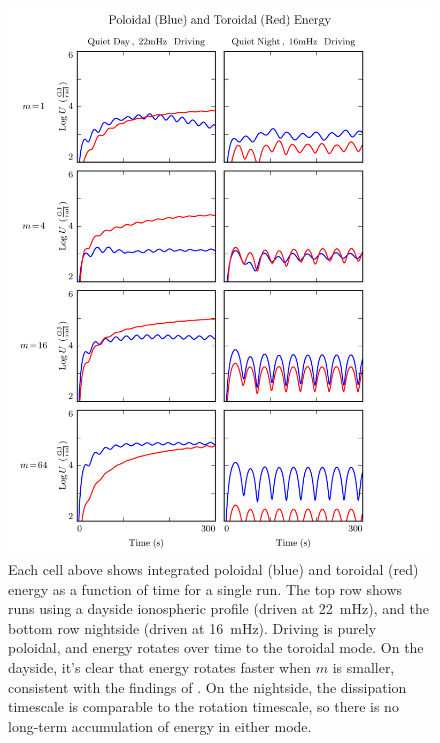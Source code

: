 \documentclass{article}
\newcommand{\azm}{\ensuremath{m}\xspace}
\begin{document}
\begin{figure}
    \label{fig_energy}
    \begin{center}
    \includegraphics[width=\textwidth]{figures/fig_energy.pdf}
    \caption{
        Each cell above shows integrated poloidal (blue) and toroidal (red) energy as a function of time for a single run. The top row shows runs using a dayside ionospheric profile (driven at \SI{22}{\mHz}), and the bottom row nightside (driven at \SI{16}{\mHz}). Driving is purely poloidal, and energy rotates over time to the toroidal mode. On the dayside, it's clear that energy rotates faster when \azm is smaller, consistent with the findings of \cite{mann_1995}. On the nightside, the dissipation timescale is comparable to the rotation timescale, so there is no long-term accumulation of energy in either mode. 
    }
    \end{center}
\end{figure}

\end{document}
